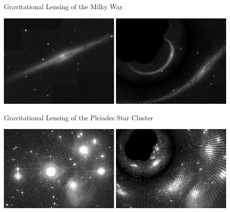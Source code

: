 \documentclass[aspectratio=1610,xcolor=dvipsnames,t]{beamer}
\begin{document}
\begin{frame}{Gravitational Lensing of the Milky Way} 
    \begin{center}
            \includegraphics[width=0.45\textwidth]{Pics/milky.eps} \hspace{1mm} 
            \includegraphics[width=0.45\textwidth]{Pics/milky3e30.eps} 
    \end{center}
\end{frame} 


\begin{frame}{Gravitational Lensing of the Pleiades Star Cluster} 
    \begin{center}
            \includegraphics[width=0.45\textwidth]{Pics/pl.eps} \hspace{1mm} 
            \includegraphics[width=0.45\textwidth]{Pics/pl2e30.eps} 
    \end{center}
\end{frame} 
\end{document}
